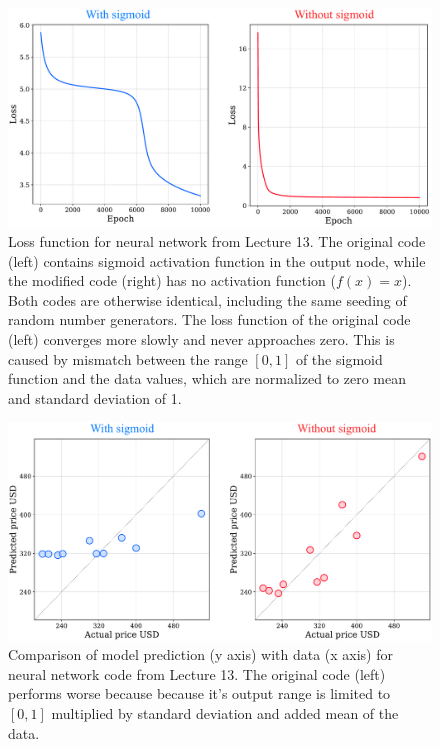 \begin{figure}[!ht]
  \centering
  \includegraphics[width=1\textwidth]{figures/lecture13_loss_compared.pdf}
  \caption{Loss function for neural network from Lecture 13. The original code (left) contains sigmoid activation function in the output node, while the modified code (right) has no activation function ($f(x) = x$). Both codes are otherwise identical, including the same seeding of random number generators. The loss function of the original code (left) converges more slowly and never approaches zero. This is caused by mismatch between the range $[0, 1]$ of the sigmoid function and the data values, which are normalized to zero mean and standard deviation of 1.}
  \label{q1_lecture13_loss_compare}
\end{figure}


\begin{figure}[!ht]
  \centering
  \includegraphics[width=1\textwidth]{figures/lecture13_results_compared.pdf}
  \caption{Comparison of model prediction (y axis) with data (x axis) for neural network code from Lecture 13. The original code (left) performs worse because because it's output range is limited to $[0, 1]$ multiplied by standard deviation and added mean of the data.}
  \label{q1_lecture13_data_prediction_compare}
\end{figure}



